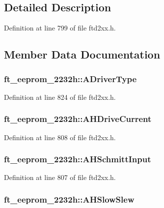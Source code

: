 \subsection{Detailed Description}


Definition at line 799 of file ftd2xx.h.

\subsection{Member Data Documentation}
\hypertarget{structft__eeprom__2232h_af3f3a2c5c9aaa729219e0139cdfb9510}{
\subsubsection[{ADriverType}]{ {\bf ft\_\-eeprom\_\-2232h::ADriverType}}}
\label{structft__eeprom__2232h_af3f3a2c5c9aaa729219e0139cdfb9510}


Definition at line 824 of file ftd2xx.h.\hypertarget{structft__eeprom__2232h_a66a0e83f79b8ab08e2b7ae6dad6a6ab9}{
\subsubsection[{AHDriveCurrent}]{ {\bf ft\_\-eeprom\_\-2232h::AHDriveCurrent}}}
\label{structft__eeprom__2232h_a66a0e83f79b8ab08e2b7ae6dad6a6ab9}


Definition at line 808 of file ftd2xx.h.\hypertarget{structft__eeprom__2232h_abeb4cedf9e0a7ff67cba78e20d1c9c53}{
\subsubsection[{AHSchmittInput}]{ {\bf ft\_\-eeprom\_\-2232h::AHSchmittInput}}}
\label{structft__eeprom__2232h_abeb4cedf9e0a7ff67cba78e20d1c9c53}


Definition at line 807 of file ftd2xx.h.\hypertarget{structft__eeprom__2232h_acfcd2fc032788785109a3f6cf48541a9}{
\subsubsection[{AHSlowSlew}]{ {\bf ft\_\-eeprom\_\-2232h::AHSlowSlew}}}
\label{structft__eeprom__2232h_acfcd2fc032788785109a3f6cf48541a9}


